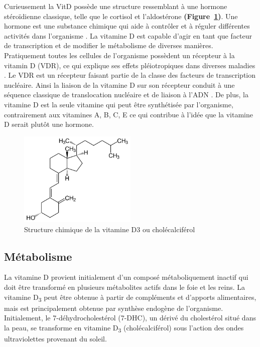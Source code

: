 \documentclass[
  letterpaper,
  DIV=11,
  numbers=noendperiod]{scrartcl}
\begin{document}
Curieusement la VitD possède une structure ressemblant à une hormone
stéroïdienne classique, telle que le cortisol et l'aldostérone
\autocite{Norman.2008} \textbf{(Figure~\ref{fig-vitd3})}. Une hormone
est une substance chimique qui aide à contrôler et à réguler différentes
activités dans l'organisme \autocite{Ellison.2020}. La vitamine D est
capable d'agir en tant que facteur de transcription et de modifier le
métabolisme de diverses manières. Pratiquement toutes les cellules de
l'organisme possèdent un récepteur à la vitamin D (VDR), ce qui explique
ses effets pléiotropiques dans diverses maladies
\autocite{Ellison.2020,Caprio.2017,Norman.2008}. Le VDR est un récepteur
faisant partie de la classe des facteurs de transcription nucléaire.
Ainsi la liaison de la vitamine D sur son récepteur conduit à une
séquence classique de translocation nucléaire et de liaison à l'ADN
\autocite{Bouillon.2008}. De plus, la vitamine D est la seule vitamine
qui peut être synthétisée par l'organisme, contrairement aux vitamines
A, B, C, E ce qui contribue à l'idée que la vitamine D serait plutôt une
hormone.

\begin{figure}

{\centering \includegraphics[width=0.5\textwidth,height=\textheight]{figures/vitamin-d3.png}

}

\caption{\label{fig-vitd3}Structure chimique de la vitamine D3 ou
cholécalciférol}

\end{figure}

\hypertarget{muxe9tabolisme}{%
\subsection{Métabolisme}\label{muxe9tabolisme}}

La vitamine D provient initialement d'un composé métaboliquement inactif
qui doit être transformé en plusieurs métabolites actifs dans le foie et
les reins. La vitamine D\textsubscript{3} peut être obtenue à partir de
compléments et d'apports alimentaires, mais est principalement obtenue
par synthèse endogène de l'organisme. Initialement, le
7-déhydrocholestérol (7-DHC), un dérivé du cholestérol situé dans la
peau, se transforme en vitamine D\textsubscript{3} (cholécalciférol)
sous l'action des ondes ultraviolettes provenant du soleil.
\end{document}

